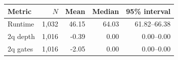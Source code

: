 \par\begin{center}\begin{minipage}{\linewidth}\def\@captype{table}
\centering
\caption{Qiskit 1.3.3 to 2.5.0rc1 paired reductions (percent). Positive reductions denote improvements; confidence intervals concern the median.}
\label{tab:qiskit}
\begin{tabular}{lrrrr}
\toprule
Metric & $N$ & Mean & Median & 95\% interval \\
\midrule
Runtime & 1,032 & 46.15 & 64.03 & 61.82--66.38 \\
2q depth & 1,016 & -0.39 & 0.00 & 0.00--0.00 \\
2q gates & 1,016 & -2.05 & 0.00 & 0.00--0.00 \\
\bottomrule
\end{tabular}
\end{minipage}\end{center}\par
